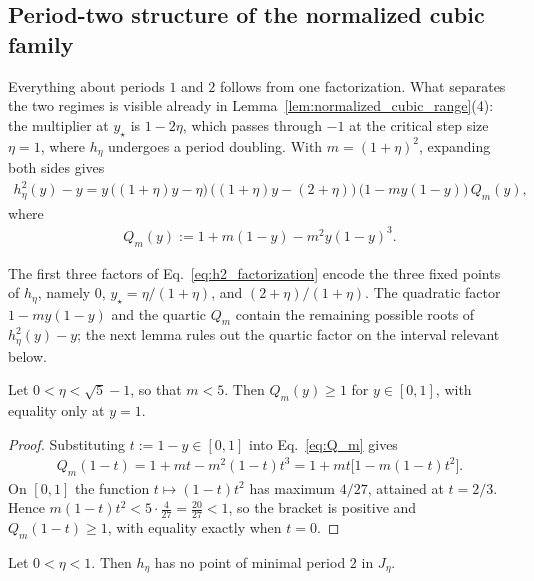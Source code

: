\documentclass{article}
\begin{document}
\subsection{Period-two structure of the normalized cubic family}
\label{subsec:stable_2_period}

Everything about periods $1$ and $2$ follows from one factorization. What
separates the two regimes is visible already in
Lemma~\ref{lem:normalized_cubic_range}(4): the multiplier at $y_\star$ is
$1-2\eta$, which passes through $-1$ at the critical step size $\eta=1$, where
$h_\eta$ undergoes a period doubling. With $m=(1+\eta)^2$, expanding both sides
gives
\begin{align}
    h_\eta^2(y)-y
    =
    y\,
    \bigl((1+\eta)y-\eta\bigr)\,
    \bigl((1+\eta)y-(2+\eta)\bigr)\,
    \bigl(1-my(1-y)\bigr)\,
    Q_m(y),
    \label{eq:h2_factorization}
\end{align}
where
\begin{align}
    Q_m(y):=1+m(1-y)-m^2y(1-y)^3 .
    \label{eq:Q_m}
\end{align}

The first three factors of Eq.~\eqref{eq:h2_factorization} encode the three
fixed points of $h_\eta$, namely $0$, $y_\star=\eta/(1+\eta)$, and
$(2+\eta)/(1+\eta)$. The quadratic factor $1-my(1-y)$ and the quartic $Q_m$
contain the remaining possible roots of $h_\eta^2(y)-y$; the next lemma rules
out the quartic factor on the interval relevant below.

\begin{lemma}
\label{lem:Q_m_positive}
Let $0<\eta<\sqrt5-1$, so that $m<5$. Then $Q_m(y)\ge1$ for $y\in[0,1]$, with
equality only at $y=1$.
\end{lemma}

\begin{proof}
Substituting $t:=1-y\in[0,1]$ into Eq.~\eqref{eq:Q_m} gives
\begin{align}
    Q_m(1-t)
    =
    1+mt-m^2(1-t)t^3
    =
    1+mt\bigl[1-m(1-t)t^2\bigr].
\end{align}
On $[0,1]$ the function $t\mapsto(1-t)t^2$ has maximum $4/27$, attained at
$t=2/3$. Hence $m(1-t)t^2<5\cdot\frac4{27}=\frac{20}{27}<1$, so the bracket is
positive and $Q_m(1-t)\ge1$, with equality exactly when $t=0$.
\end{proof}

\begin{proposition}
\label{prop:subcritical_no_period_two}
Let $0<\eta<1$. Then $h_\eta$ has no point of minimal period $2$ in $J_\eta$.
\end{proposition}
\end{document}
